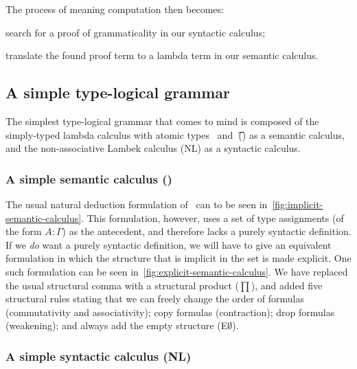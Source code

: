 \documentclass[a4paper]{article}
\begin{document}
The process of meaning computation then becomes:
\begin{enumerate*}[label=(\arabic*)]
\item search for a proof of grammaticality in our syntactic calculus;
\item translate the found proof term to a lambda term in our semantic
  calculus.
\end{enumerate*}


\subsection{A simple type-logical grammar}
The simplest type-logical grammar that comes to mind is composed of
the simply-typed lambda calculus with atomic types \e\ and \t\ () as
a semantic calculus, and the non-associative Lambek calculus (NL) as a
syntactic calculus.

\subsubsection{A simple semantic calculus ()}
The usual natural deduction formulation of \ can to be seen
in~\autoref{fig:implicit-semantic-calculus}.
%
%
%
This formulation, however, uses a set of type assignments (of the form
$A : Γ$) as the antecedent, and therefore lacks a purely syntactic
definition.
%
If we \emph{do} want a purely syntactic definition, we will have to
give an equivalent formulation in which the structure that is implicit
in the set is made explicit. One such formulation can be seen
in~\autoref{fig:explicit-semantic-calculus}. We have replaced the
usual structural comma with a structural product ($\prod$), and added
five structural rules stating that we can freely change the order of
formulas (commutativity and associativity); copy formulas
(contraction); drop formulas (weakening); and always add the empty
structure (E$\emptyset$).

\subsubsection{A simple syntactic calculus (NL)}
\citet[p. 33, 105-106]{moot2012}





%
%
%
%


%
%
\end{document}
